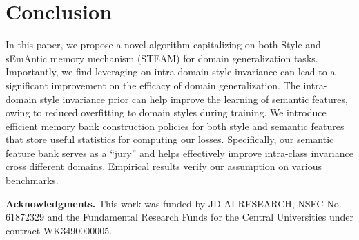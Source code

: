 \documentclass[10pt,twocolumn,letterpaper]{article}
\newcommand{\0}{{\bf 0}}
\begin{document}
\section{Conclusion}
In this paper, we propose a novel algorithm capitalizing on both Style and sEmAntic memory mechanism (STEAM) for domain generalization tasks. Importantly, we find leveraging on intra-domain style invariance can lead to a significant improvement on the efficacy of domain generalization. The intra-domain style invariance prior can help improve the learning of semantic features, owing to reduced overfitting to domain styles during training. We introduce efficient memory bank construction policies for both style and semantic features that store useful statistics for computing our losses. Specifically, our semantic feature bank serves as a ``jury'' and helps effectively improve intra-class invariance cross different domains. Empirical results verify our assumption on various benchmarks.

\textbf{Acknowledgments.} This work was funded by JD AI RESEARCH, NSFC No. 61872329 and the Fundamental Research Funds for the Central Universities under contract WK3490000005.


{\small


}
\end{document}
